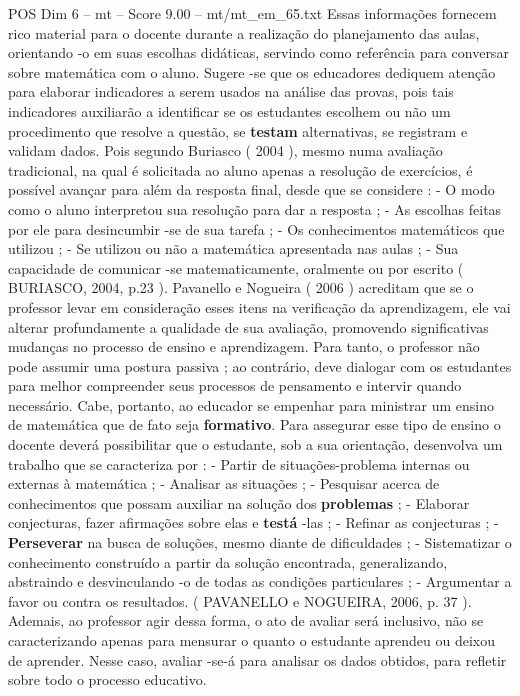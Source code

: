 \begin{textsample}{POS Dim 6 – mt – Score 9.00 – mt/mt\_em\_65.txt}
Essas informações fornecem rico material para o docente durante a realização do planejamento das aulas, orientando -o em suas escolhas didáticas, servindo como referência para conversar sobre matemática com o aluno.
Sugere -se que os educadores dediquem atenção para elaborar indicadores a serem usados na análise das provas, pois tais indicadores auxiliarão a identificar se os estudantes escolhem ou não um procedimento que resolve a questão, se \textbf{testam} alternativas, se registram e validam dados.
Pois segundo Buriasco ( 2004 ), mesmo numa avaliação tradicional, na qual é solicitada ao aluno apenas a resolução de exercícios, é possível avançar para além da resposta final, desde que se considere : - O modo como o aluno interpretou sua resolução para dar a resposta ; - As escolhas feitas por ele para desincumbir -se de sua tarefa ; - Os conhecimentos matemáticos que utilizou ; - Se utilizou ou não a matemática apresentada nas aulas ; - Sua capacidade de comunicar -se matematicamente, oralmente ou por escrito ( BURIASCO, 2004, p.23 ).
Pavanello e Nogueira ( 2006 ) acreditam que se o professor levar em consideração esses itens na verificação da aprendizagem, ele vai alterar profundamente a qualidade de sua avaliação, promovendo significativas mudanças no processo de ensino e aprendizagem.
Para tanto, o professor não pode assumir uma postura passiva ; ao contrário, deve dialogar com os estudantes para melhor compreender seus processos de pensamento e intervir quando necessário.
Cabe, portanto, ao educador se empenhar para ministrar um ensino de matemática que de fato seja \textbf{formativo}.
Para assegurar esse tipo de ensino o docente deverá possibilitar que o estudante, sob a sua orientação, desenvolva um trabalho que se caracteriza por : - Partir de situações-problema internas ou externas à matemática ; - Analisar as situações ; - Pesquisar acerca de conhecimentos que possam auxiliar na solução dos \textbf{problemas} ; - Elaborar conjecturas, fazer afirmações sobre elas e \textbf{testá} -las ; - Refinar as conjecturas ; - \textbf{Perseverar} na busca de soluções, mesmo diante de dificuldades ; - Sistematizar o conhecimento construído a partir da solução encontrada, generalizando, abstraindo e desvinculando -o de todas as condições particulares ; - Argumentar a favor ou contra os resultados. ( PAVANELLO e NOGUEIRA, 2006, p. 37 ).
Ademais, ao professor agir dessa forma, o ato de avaliar será inclusivo, não se caracterizando apenas para mensurar o quanto o estudante aprendeu ou deixou de aprender.
Nesse caso, avaliar -se-á para analisar os dados obtidos, para refletir sobre todo o processo educativo.

\end{textsample}
